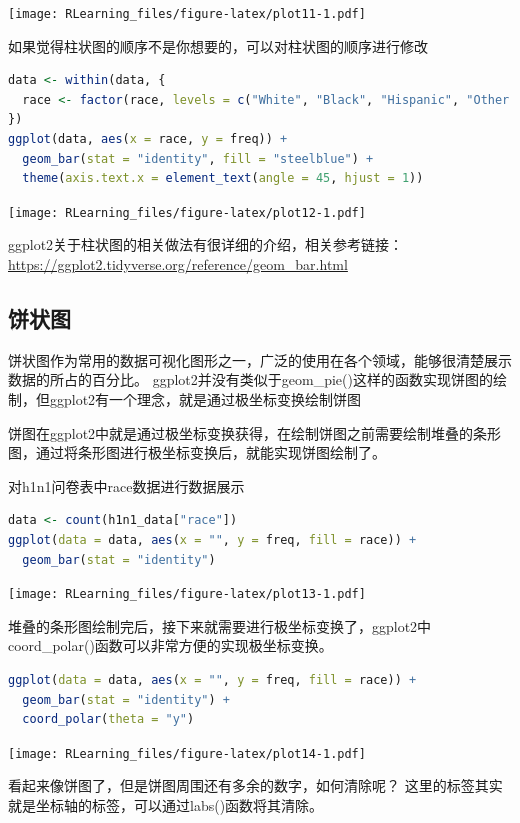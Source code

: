 \documentclass[]{ctexbook}
\begin{document}
\texttt{[image: RLearning\_files/figure-latex/plot11-1.pdf]}

如果觉得柱状图的顺序不是你想要的，可以对柱状图的顺序进行修改

\begin{lstlisting}[language=R]
data <- within(data, {
  race <- factor(race, levels = c("White", "Black", "Hispanic", "Other or Multiple"))
})
ggplot(data, aes(x = race, y = freq)) +
  geom_bar(stat = "identity", fill = "steelblue") +
  theme(axis.text.x = element_text(angle = 45, hjust = 1))
\end{lstlisting}

\texttt{[image: RLearning\_files/figure-latex/plot12-1.pdf]}

ggplot2关于柱状图的相关做法有很详细的介绍，相关参考链接：
\url{https://ggplot2.tidyverse.org/reference/geom_bar.html}

\hypertarget{ux997cux72b6ux56fe}{%
\subsection{饼状图}\label{ux997cux72b6ux56fe}}

饼状图作为常用的数据可视化图形之一，广泛的使用在各个领域，能够很清楚展示数据的所占的百分比。
ggplot2并没有类似于geom\_pie()这样的函数实现饼图的绘制，但ggplot2有一个理念，就是通过极坐标变换绘制饼图

饼图在ggplot2中就是通过极坐标变换获得，在绘制饼图之前需要绘制堆叠的条形图，通过将条形图进行极坐标变换后，就能实现饼图绘制了。

对h1n1问卷表中race数据进行数据展示

\begin{lstlisting}[language=R]
data <- count(h1n1_data["race"])
ggplot(data = data, aes(x = "", y = freq, fill = race)) +
  geom_bar(stat = "identity")
\end{lstlisting}

\texttt{[image: RLearning\_files/figure-latex/plot13-1.pdf]}

堆叠的条形图绘制完后，接下来就需要进行极坐标变换了，ggplot2中coord\_polar()函数可以非常方便的实现极坐标变换。

\begin{lstlisting}[language=R]
ggplot(data = data, aes(x = "", y = freq, fill = race)) +
  geom_bar(stat = "identity") +
  coord_polar(theta = "y")
\end{lstlisting}

\texttt{[image: RLearning\_files/figure-latex/plot14-1.pdf]}

看起来像饼图了，但是饼图周围还有多余的数字，如何清除呢？
这里的标签其实就是坐标轴的标签，可以通过labs()函数将其清除。
\end{document}
